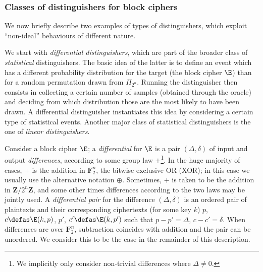 \subsubsection{Classes of distinguishers for block ciphers}
 
We now briefly describe two examples of types of distinguishers, which exploit ``non-ideal'' behaviours of different nature.

\bigskip

We start with \emph{differential distinguishers}, which are part of the broader class of \emph{statistical} distinguishers.
The basic idea of the latter is to define an event which has a different probability distribution for the target (the block cipher $\E$)
than for a random permutation drawn from $\Pi_{2^n}$. Running the distinguisher then consists in collecting a certain number of samples (obtained through
the oracle) and deciding from which distribution
those are the
most likely to have been drawn.
A differential distinguisher instantiates this idea by considering a certain type of statistical events. Another major class of
statistical distinguishers is the one of \emph{linear distinguishers}.

Consider a block cipher $\E$; a \emph{differential} for $\E$ is a pair $(\Delta,\delta)$ of input and output \emph{differences},
according to some group law $+$\footnote{We implicitly only consider non-trivial differences where $\Delta \neq 0$.}.
In the huge majority of cases, $+$ is the addition in $\mathbf{F}_2^n$,
\ie the bitwise exclusive OR (XOR); in this case we usually use the alternative notation $\oplus$. Sometimes, $+$
is taken to be the addition in $\mathbf{Z}/2^n\mathbf{Z}$, and some other times differences according to the two laws may be jointly used.
A \emph{differential pair} for the difference $(\Delta,\delta)$ is an ordered pair of plaintexts and their corresponding ciphertexts (for some
key $k$)
$p$, $c \defas \E(k,p)$, $p'$, $c' \defas \E(k,p')$ such that $p - p' = \Delta$, $c - c' = \delta$. When differences are over $\mathbf{F}_2^n$,
subtraction coincides with addition and the pair can be unordered. We consider this to be the case in the remainder of this description.

